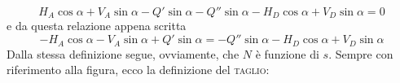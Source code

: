 \begin{equation*} 
H_{A} \cos{\alpha} + V_{A}\sin{\alpha} - Q'\sin{\alpha} - Q''\sin{\alpha} - H_{D} \cos{\alpha} + V_{D}\sin{\alpha}  = 0  
\end{equation*}
e da questa relazione appena scritta
\begin{equation} \label{equazione11-3}
\boxed{ -H_{A} \cos{\alpha} - V_{A}\sin{\alpha} + Q'\sin{\alpha} = -Q''\sin{\alpha} - H_{D} \cos{\alpha} + V_{D}\sin{\alpha} } \tag{11.3}
\end{equation}
Dalla stessa definizione segue, ovviamente, che $N$ è funzione di $s$. Sempre con riferimento alla figura, ecco la definizione del \textsc{taglio}:
\\

\\

